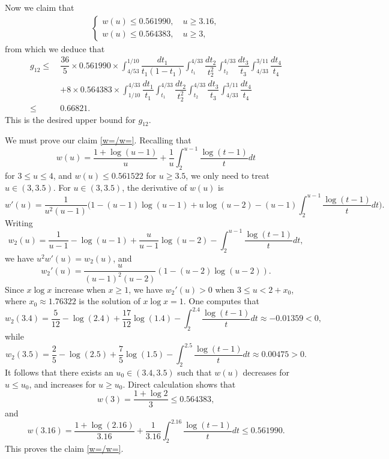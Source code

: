 \documentclass[12pt, a4paper]{amsart}
\def\leq{\leqslant}
\def\geq{\geqslant}
\def\le{\leqslant}
\def\ge{\geqslant}
\theoremstyle{plain}
\theoremstyle{remark}
\numberwithin{equation}{section}
\begin{document}
Now we claim that 
\begin{equation}\label{w=/w=}
\begin{aligned}
\begin{cases} 
w(u)\le 0.561990, \quad u \geq 3.16, \\ 
w(u)\le 0.564383, \quad u \geq 3, 
\end{cases} 
\end{aligned}
\end{equation}
from which we deduce that 
\begin{equation}\label{g12}
\begin{aligned}
g_{12} 
\le\ & \dfrac{36}{5}\times 0.561990\times \int_{4/53}^{1/10}\dfrac{dt_1}{t_1(1-t_1)}\int_{t_1}^{4/33}\dfrac{dt_2}{t_2^2}\int_{t_2}^{4/33}\dfrac{dt_3}{t_3}\int_{4/33}^{3/11}\dfrac{dt_4}{t_4}\\
&+8\times 0.564383\times\int_{1/10}^{4/33}\dfrac{dt_1}{t_1}\int_{t_1}^{4/33}\dfrac{dt_2}{t_2^2}\int_{t_2}^{4/33}\dfrac{dt_3}{t_3}\int_{4/33}^{3/11}\dfrac{dt_4}{t_4}\\
\le\ & 0.66821. 
\end{aligned}
\end{equation}
This is the desired upper bound for $g_{12}$. 

We must prove our claim \eqref{w=/w=}. Recalling that 
$$
w(u) =
\frac{1+\log(u-1)}{u}+\dfrac{1}{u}\int_{2}^{u-1}\dfrac{\log(t-1)}{t}dt
$$
for $3 \le u \leq 4$, and $w(u)\le 0.561522$ for $u \geq 3.5$,  we only need to treat $u\in (3, 3.5)$. 
For $u\in (3, 3.5)$, the derivative of $w(u)$ is 
$$
w'(u)=\frac{1}{u^2(u-1)}\bigg(1-(u-1)\log (u-1)+u\log (u-2)-(u-1)\int_{2}^{u-1}\frac{\log (t-1)}{t}dt\bigg). 
$$
Writing   
$$
w_2(u)=\dfrac{1}{u-1}-\log (u-1)+\dfrac{u}{u-1}\log (u-2)-\int_{2}^{u-1}\frac{\log (t-1)}{t}dt,
$$
we have $u^2 w'(u)=w_2(u)$, and 
\[
w_2'(u)=\dfrac{u}{(u-1)^2(u-2)}(1-(u-2)\log(u-2)). 
\] 
Since $x\log x$ increase when $x\ge 1$, we have $w_2'(u)>0$ when $3\leq u<2+x_0$, 
where $x_0 \approx 1.76322$ is the solution of $x\log x=1$. 
One computes that 
\[ 
w_2(3.4)=\dfrac{5}{12}-\log (2.4)+\dfrac{17}{12}\log (1.4)-\int_{2}^{2.4}\frac{\log (t-1)}{t}dt\approx -0.01359<0,
\] 
while 
\[
w_2(3.5)=\dfrac{2}{5}-\log (2.5)+\dfrac{7}{5}\log (1.5)-\int_{2}^{2.5}\frac{\log (t-1)}{t}dt\approx 0.00475>0. 
\]	
It follows that there exists an $u_0\in (3.4,3.5)$ such that $w(u)$ decreases for $u\le u_0$, and increases for $u\ge u_0$. 
Direct calculation shows that 
\[
w(3)=\dfrac{1+\log 2}{3}\le 0.564383, 
\] 
and 
\[
w(3.16)=\dfrac{1+\log (2.16)}{3.16}+\dfrac{1}{3.16}\int_{2}^{2.16}\dfrac{\log(t-1)}{t}dt\le 0.561990. 
\] 
This proves the claim \eqref{w=/w=}. 
	
\end{document}
